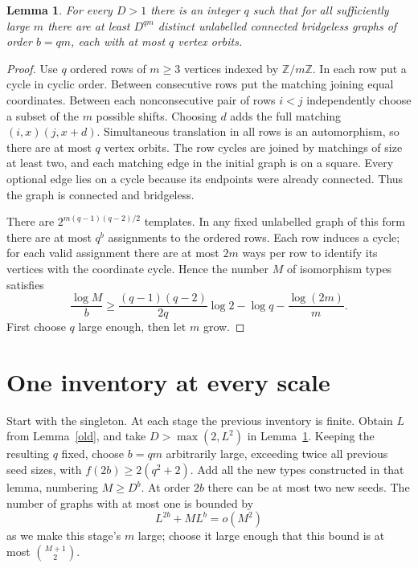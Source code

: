 \documentclass[11pt]{article}
\newtheorem{lemma}[theorem]{Lemma}
\begin{document}
\begin{lemma}\label{many}
For every $D>1$ there is an integer $q$ such that for all sufficiently large $m$ there are at least $D^{qm}$ distinct unlabelled connected bridgeless graphs of order $b=qm$, each with at most $q$ vertex orbits.
\end{lemma}
\begin{proof}
Use $q$ ordered rows of $m\ge3$ vertices indexed by $\mathbb Z/m\mathbb Z$. In each row put a cycle in cyclic order. Between consecutive rows put the matching joining equal coordinates. Between each nonconsecutive pair of rows $i<j$ independently choose a subset of the $m$ possible shifts. Choosing $d$ adds the full matching $(i,x)(j,x+d)$. Simultaneous translation in all rows is an automorphism, so there are at most $q$ vertex orbits. The row cycles are joined by matchings of size at least two, and each matching edge in the initial graph is on a square. Every optional edge lies on a cycle because its endpoints were already connected. Thus the graph is connected and bridgeless.

There are $2^{m(q-1)(q-2)/2}$ templates. In any fixed unlabelled graph of this form there are at most $q^b$ assignments to the ordered rows. Each row induces a cycle; for each valid assignment there are at most $2m$ ways per row to identify its vertices with the coordinate cycle. Hence the number $M$ of isomorphism types satisfies
\[
 \frac{\log M}{b}\ge
 \frac{(q-1)(q-2)}{2q}\log 2-\log q-\frac{\log(2m)}{m}.
\]
First choose $q$ large enough, then let $m$ grow.
\end{proof}

\section{One inventory at every scale}
Start with the singleton. At each stage the previous inventory is finite. Obtain $L$ from Lemma~\ref{old}, and take $D>\max(2,L^2)$ in Lemma~\ref{many}. Keeping the resulting $q$ fixed, choose $b=qm$ arbitrarily large, exceeding twice all previous seed sizes, with $f(2b)\ge 2(q^2+2)$. Add all the new types constructed in that lemma, numbering $M\ge D^b$. At order $2b$ there can be at most two new seeds. The number of graphs with at most one is bounded by
\[
 L^{2b}+ML^b=o(M^2)
\]
as we make this stage's $m$ large; choose it large enough that this bound is at most $\binom{M+1}{2}$.
\end{document}
